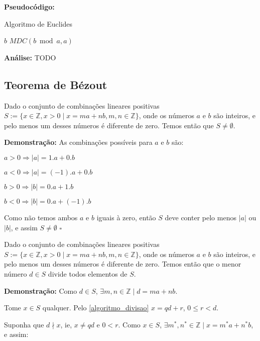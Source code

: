 \textbf{Pseudocódigo:}
\begin{algorithm}
\caption{Algoritmo de Euclides}\label{mdc}
\begin{algorithmic}[1]
\State \Return $b$
\EndIf
\State \Return $MDC(b \bmod a, a)$
\EndProcedure
\end{algorithmic}
\end{algorithm}

\textbf{Análise:}
TODO



\subsection{Teorema de Bézout}

\begin{corollary}\label{bezout_conjunto_nao_nulo}
Dado o conjunto de combinações lineares positivas $S := \{x\in\mathbb{Z}, x>0 \mid x = ma + nb, m,n\in \mathbb{Z}\}$, onde os números $a$ e $b$ são inteiros, 
e pelo menos um desses números é diferente de zero. Temos então que $S \neq \emptyset$. 
\end{corollary}
\textbf{Demonstração:}
As combinações possíveis para $a$ e $b$ são:

$a > 0 \Rightarrow |a| = 1.a + 0.b$

$a < 0 \Rightarrow |a| = (-1).a + 0.b$

$b > 0 \Rightarrow |b| = 0.a + 1.b$

$b < 0 \Rightarrow |b| = 0.a + (-1).b$

Como não temos ambos $a$ e $b$ iguais à zero, então $S$ deve conter pelo menos $|a|$ ou $|b|$, e assim $S \neq \emptyset$ $\square$


\begin{corollary}\label{bezout_conjunto_divide}
Dado o conjunto de combinações lineares positivas $S := \{x\in\mathbb{Z}, x>0 \mid x = ma + nb, m,n\in \mathbb{Z}\}$, onde os números $a$ e $b$ são inteiros, 
e pelo menos um desses números é diferente de zero. Temos então que o menor número $d \in S$ divide todos elementos de $S$.
\end{corollary}
\textbf{Demonstração:}
Como $d \in S$, $\exists m,n\in\mathbb{Z} \mid d = ma + nb$.

Tome $x \in S$ qualquer. Pelo \autoref{algoritmo_divisao} $x = qd + r$, $0 \leq r < d$.

Suponha que $d\nmid x$, ie, $x \neq qd$ e $0 < r$. Como $x \in S$, $\exists m^*,n^*\in\mathbb{Z} \mid x = m^*a + n^*b$, e assim:

